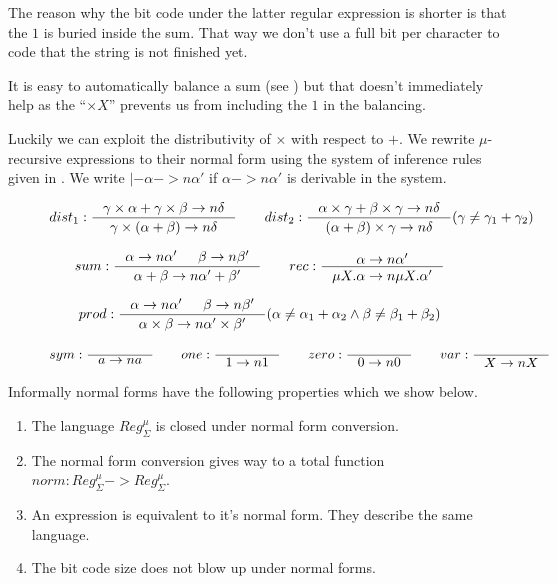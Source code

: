 \documentclass[a4paper, oneside]{memoir}
\let\fref\undefined
\theoremstyle{definition}
\begin{document}
The reason why the bit code under the latter regular expression is shorter is
that the $1$ is buried inside the sum. That way we don't use a full bit per
character to code that the string is not finished yet.

It is easy to automatically balance a sum (see \fref{chap:huffman}) but that
doesn't immediately help as the ``$\times X$'' prevents us from including the
$1$ in the balancing.

Luckily we can exploit the distributivity of $\times$ with respect to $+$. We
rewrite $\mu$-recursive expressions to their normal form using the system of
inference rules given in \fref{fig:normal-form}. We write $|- \alpha ->n
\alpha'$ if $\alpha ->n \alpha'$ is derivable in the system.

\begin{figure}
\[
dist_1 : \inference{\gamma \times \alpha + \gamma \times \beta ->n \delta}{\gamma \times
  (\alpha + \beta) ->n \delta} \qquad
dist_2 : \inference{\alpha \times \gamma + \beta \times \gamma ->n \delta}{(\alpha +
  \beta) \times \gamma ->n \delta}(\gamma \neq \gamma_1 + \gamma_2)
\]

\[
sum : \inference{\alpha ->n \alpha' & \beta ->n \beta'}{\alpha + \beta ->n \alpha' +
  \beta'} \qquad
rec : \inference{\alpha ->n \alpha'}{\mu X. \alpha ->n \mu X. \alpha'}
\]

\[
prod : \inference{\alpha ->n \alpha' & \beta ->n \beta'}{\alpha \times \beta ->n \alpha'
  \times \beta'}(\alpha \neq \alpha_1 + \alpha_2 \land \beta \neq \beta_1 + \beta_2)
\]

\[
sym : \inference{}{a ->n a} \qquad
one : \inference{}{1 ->n 1} \qquad
zero : \inference{}{0 ->n 0} \qquad
var : \inference{}{X ->n X}
\]
\label{fig:normal-form}
\end{figure}

Informally normal forms have the following properties which we show below.
\begin{enumerate}
\item The language $Reg_{\Sigma}^{\mu}$ is closed under normal form conversion.
\item The normal form conversion gives way to a total function $norm :
  Reg_{\Sigma}^{\mu} -> Reg_{\Sigma}^{\mu}$.
\item An expression is equivalent to it's normal form. They describe the same
  language.
\item The bit code size does not blow up under normal forms.
\end{enumerate}
\end{document}
